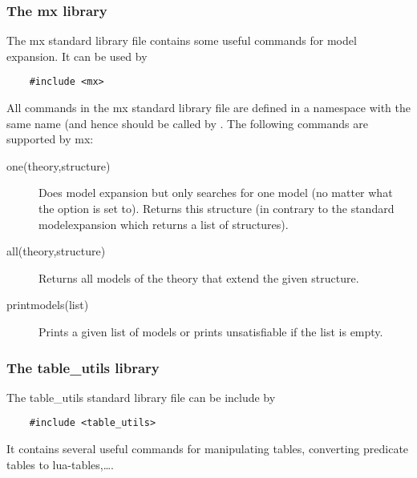 \subsubsection{The mx library}
The mx standard library file contains some useful commands for model expansion. It can be used by 
\begin{lstlisting}
	#include <mx>
\end{lstlisting}
All commands in the mx standard library file are defined in a namespace with the same name (and hence should be called by .
The following commands are supported by mx:
\begin{description}
	\item[one(theory,structure)]
		Does model expansion but only searches for one model (no matter what the  option is set to). Returns this structure (in contrary to the standard modelexpansion which returns a list of structures).
	\item[all(theory,structure)] 
		Returns all models of the theory that extend the given structure.
	\item[printmodels(list)]
		Prints a given list of models or prints unsatisfiable if the list is empty.
\end{description}

\subsubsection{The table\_utils library}
The table\_utils standard library file can be include by 
\begin{lstlisting}
	#include <table_utils>
\end{lstlisting}
It contains several useful commands for manipulating tables, converting predicate tables to lua-tables,\ldots.


